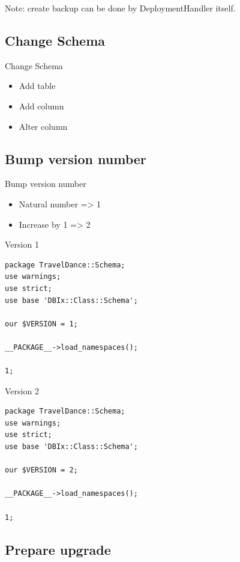Note: create backup can be done by DeploymentHandler itself.

\subsection{Change Schema}

\begin{frame}{Change Schema}
\begin{itemize}
\item Add table
\item Add column
\item Alter column
\end{itemize}
\end{frame}

\subsection{Bump version number}
\begin{frame}{Bump version number}
\begin{itemize}
\item Natural number => 1
\item Increase by 1 => 2
\end{itemize}
\end{frame}

\begin{frame}[fragile]{Version 1}
\begin{lstlisting}
package TravelDance::Schema;
use warnings;
use strict;
use base 'DBIx::Class::Schema';

our $VERSION = 1;

__PACKAGE__->load_namespaces();

1;
\end{lstlisting}
\end{frame}

\begin{frame}[fragile]{Version 2}
\begin{lstlisting}
package TravelDance::Schema;
use warnings;
use strict;
use base 'DBIx::Class::Schema';

our $VERSION = 2;

__PACKAGE__->load_namespaces();

1;
\end{lstlisting}
\end{frame}

\subsection{Prepare upgrade}

